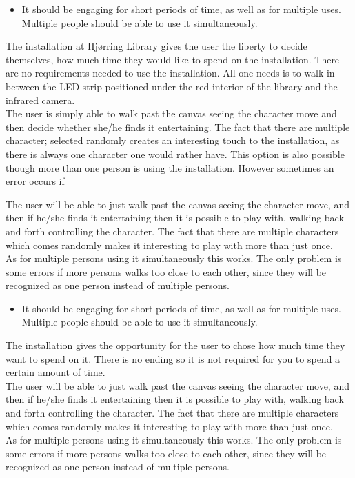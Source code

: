 \begin{itemize}
\item It should be engaging for short periods of time, as well as for multiple uses. Multiple people should be able to use it simultaneously.
\end{itemize}
The installation at Hj{\o}rring Library gives the user the liberty to decide themselves, how much time they would like to spend on the installation. There are no requirements needed to use the installation. All one needs is to walk in between the LED-strip positioned under the red interior of the library and the infrared camera.\\
The user is simply able to walk past the canvas seeing the character move and then decide whether she/he finds it entertaining. The fact that there are multiple character; selected randomly creates an interesting touch to the installation, as there is always one character one would rather have. This option is also possible though more than one person is using the installation. However sometimes an error occurs if 

The user will be able to just walk past the canvas seeing the character move, and then if he/she finds it entertaining then it is possible to play with, walking back and forth controlling the character. The fact that there are multiple characters which comes randomly makes it interesting to play with more than just once.\\
As for multiple persons using it simultaneously this works. The only problem is some errors if more persons walks too close to each other, since they will be recognized as one person instead of multiple persons.


\begin{itemize}
\item It should be engaging for short periods of time, as well as for multiple uses. Multiple people should be able to use it simultaneously.
\end{itemize}
The installation gives the opportunity for the user to chose how much time they want to spend on it. There is no ending so it is not required for you to spend a certain amount of time. \\
The user will be able to just walk past the canvas seeing the character move, and then if he/she finds it entertaining then it is possible to play with, walking back and forth controlling the character. The fact that there are multiple characters which comes randomly makes it interesting to play with more than just once.\\
As for multiple persons using it simultaneously this works. The only problem is some errors if more persons walks too close to each other, since they will be recognized as one person instead of multiple persons.

